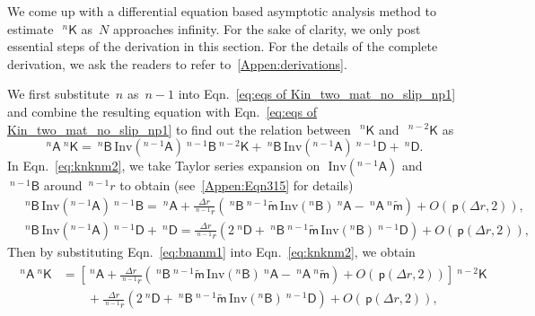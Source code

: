 \documentclass[preprint,10pt,times]{elsarticle}
\numberwithin{equation}{section}
\renewcommand{\u}[1]{\boldsymbol{#1}}
\newcommand{\usf}[1]{\u{\mathsf #1}}
\newcommand{\pr}[1]{\left( #1 \right)}
\newcommand{\p}{\,\mathsf{p}}
\newcommand{\Inv}{\,\mathrm{Inv}}
\renewcommand{\>}{$\Rightarrow$}
\begin{document}
We come up with a differential equation based asymptotic analysis method to estimate~$~^{n}{\usf{K}}$ as~$N$ approaches infinity. For the sake of clarity, we only post essential steps of the derivation in this section. For the details of the complete derivation, we ask the readers to refer to~\ref{Appen:derivations}.

We first substitute~$n$ as~$n-1$ into Eqn.~\eqref{eq:eqs of Kin_two_mat_no_slip_np1} and combine the resulting equation with Eqn.~\eqref{eq:eqs of Kin_two_mat_no_slip_np1} to find out the relation between~$~^{n}{\usf{K}}$ and~$~^{{n-2}}{\usf{K}}$ as
\begin{equation}
	~^{n}{\usf{A}} ~^{n}{\usf{K}}  = ~^{n}{\usf{B}} \Inv\pr{{}^{{n-1}}\usf{A}} ~^{{n-1}}{\usf{B}} ~^{{n-2}}{\usf{K}} + ~^{n}{\usf{B}} \Inv\pr{{}^{{n-1}}\usf{A}} ~^{{n-1}}{\usf{D}}  + ~^{n}{\usf{D}} .
	\label{eq:knknm2}
\end{equation}
In Eqn.~\eqref{eq:knknm2}, we take Taylor series expansion on~$\Inv\pr{{}^{{n-1}}\usf{A}}$ and~$~^{{n-1}}{\usf{B}}$ around~${}^{n-1}\!{r}$ to obtain (see~\ref{Appen:Eqn315} for details)
\begin{subequations}
	\begin{align}
	& ~^{n}{\usf{B}} \Inv\pr{{}^{{n-1}}\usf{A}} ~^{{n-1}}{\usf{B}} = ~^{n}{\usf{A}} + \frac{\Delta r}{~^{n-1}\!{r}} \left( ~^{n}{\usf{B}} ~^{n-1}\tilde{\usf{m}} \Inv\pr{{}^{n}\usf{B}} ~^{n}{\usf{A}} - ~^{n}{\usf{A}} ~^{n}\tilde{\usf{m}} \right)  + O(\p\pr{\Delta r,2}), \\
	& ~^{n}{\usf{B}} \Inv\pr{{}^{{n-1}}\usf{A}} ~^{{n-1}}{\usf{D}} + ~^{n}{\usf{D}} = \frac{\Delta r}{~^{n-1}\!{r}} \left( 2~^{n}{\usf{D}} + ~^{n}{\usf{B}} ~^{n-1}\tilde{\usf{m}} \Inv\pr{{}^{n}\usf{B}} ~^{{n-1}}{\usf{D}} \right) + O(\p\pr{\Delta r,2}),
	\end{align}
	\label{eq:bnanm1}
\end{subequations}
Then by substituting Eqn.~\eqref{eq:bnanm1} into Eqn.~\eqref{eq:knknm2}, we obtain
\begin{equation}
\begin{aligned}
	\begin{split}
	~^{n}{\usf{A}} ~^{n}{\usf{K}} & = \left[  ~^{n}{\usf{A}} + \frac{\Delta r}{~^{n-1}\!{r}} \left( ~^{n}{\usf{B}} ~^{n-1}\tilde{\usf{m}} \Inv\pr{{}^{n}\usf{B}} ~^{n}{\usf{A}} - ~^{n}{\usf{A}} ~^{n}\tilde{\usf{m}} \right)  + O(\p\pr{\Delta r,2}) \right] ~^{{n-2}}{\usf{K}} \\
	& \qquad + \frac{\Delta r}{~^{n-1}\!{r}} \left( 2~^{n}{\usf{D}} + ~^{n}{\usf{B}} ~^{n-1}\tilde{\usf{m}} \Inv\pr{{}^{n}\usf{B}} ~^{{n-1}}{\usf{D}} \right) + O(\p\pr{\Delta r,2}),
	\end{split}
\end{aligned}
\label{eq:knknm2appr1}
\end{equation}
\end{document}
